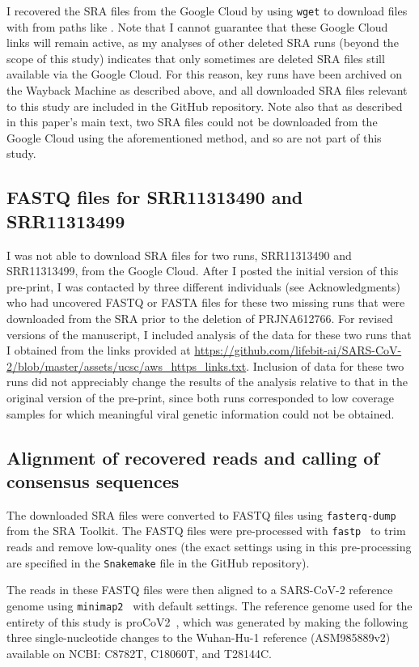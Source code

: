 \documentclass[9pt,twocolumn,twoside]{gsajnl_modified}
\begin{document}
{I recovered the SRA files from the Google Cloud by using \texttt{wget} to download files with from paths like .
Note that I cannot guarantee that these Google Cloud links will remain active, as my analyses of other deleted SRA runs (beyond the scope of this study) indicates that only sometimes are deleted SRA files still available via the Google Cloud.
For this reason, key runs have been archived on the Wayback Machine as described above, and all downloaded SRA files relevant to this study are included in the GitHub repository.
Note also that as described in this paper's main text, two SRA files could not be downloaded from the Google Cloud using the aforementioned method, and so are not part of this study.

\subsection{FASTQ files for SRR11313490 and SRR11313499}
I was not able to download SRA files for two runs, SRR11313490 and SRR11313499, from the Google Cloud.
After I posted the initial version of this pre-print, I was contacted by three different individuals (see Acknowledgments) who had uncovered FASTQ or FASTA files for these two missing runs that were downloaded from the SRA prior to the deletion of PRJNA612766.
For revised versions of the manuscript, I included analysis of the data for these two runs that I obtained from the links provided at \url{https://github.com/lifebit-ai/SARS-CoV-2/blob/master/assets/ucsc/aws_https_links.txt}.
Inclusion of data for these two runs did not appreciably change the results of the analysis relative to that in the original version of the pre-print, since both runs corresponded to low coverage samples for which meaningful viral genetic information could not be obtained.

\subsection{Alignment of recovered reads and calling of consensus sequences}
The downloaded SRA files were converted to FASTQ files using \texttt{fasterq-dump} from the SRA Toolkit.
The FASTQ files were pre-processed with \texttt{fastp}~\citep{chen2018fastp} to trim reads and remove low-quality ones (the exact settings using in this pre-processing are specified in the \texttt{Snakemake} file in the GitHub repository).

The reads in these FASTQ files were then aligned to a SARS-CoV-2 reference genome using \texttt{minimap2}~\citep{li2018minimap2} with default settings.
The reference genome used for the entirety of this study is proCoV2~\citep{kumar2021evolutionary}, which was generated by making the following three single-nucleotide changes to the Wuhan-Hu-1 reference (ASM985889v2) available on NCBI: C8782T, C18060T, and T28144C.

}
\end{document}
